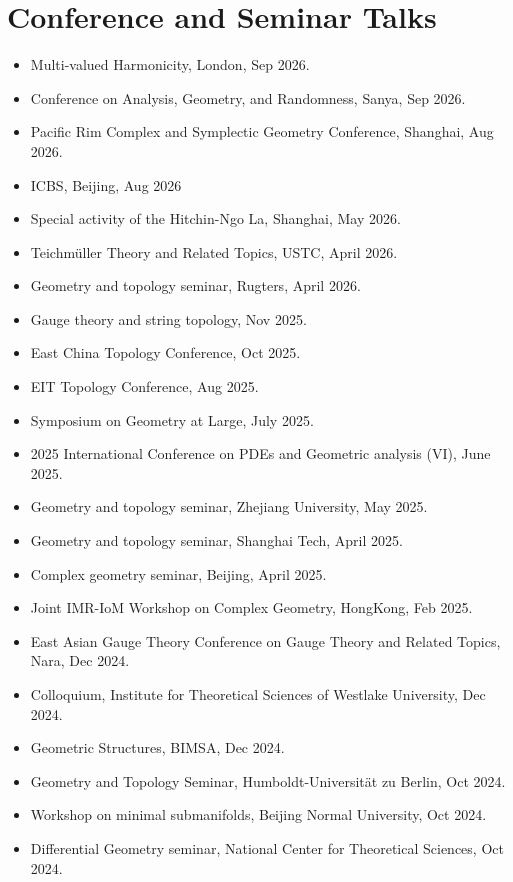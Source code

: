 \documentclass[a4paper,10pt]{article}
\begin{document}
\section*{Conference and Seminar Talks}
\begin{itemize}[leftmargin=1.5cm] 
\item Multi-valued Harmonicity, London, Sep 2026.
\item Conference on Analysis, Geometry, and Randomness, Sanya, Sep 2026.
\item Pacific Rim Complex and Symplectic Geometry Conference, Shanghai, Aug 2026.
\item ICBS, Beijing, Aug 2026
\item Special activity of the Hitchin-Ngo La, Shanghai, May 2026.
\item Teichm\"uller Theory and Related Topics, USTC, April 2026.
\item Geometry and topology seminar, Rugters, April 2026.
\item Gauge theory and string topology, Nov 2025.
\item East China Topology Conference, Oct 2025.
\item EIT Topology Conference, Aug 2025.
\item Symposium on Geometry at Large, July 2025.
   \item 2025 International Conference on PDEs and Geometric analysis (VI), June 2025.
   \item Geometry and topology seminar, Zhejiang University, May 2025.
   \item Geometry and topology seminar, Shanghai Tech, April 2025.
   \item Complex geometry seminar, Beijing, April 2025.
   \item  Joint IMR-IoM Workshop on Complex Geometry, HongKong, Feb 2025.
    \item East Asian Gauge Theory Conference on Gauge Theory and Related Topics, Nara, Dec 2024.
    \item Colloquium, Institute for Theoretical Sciences of Westlake University, Dec 2024.
    \item Geometric Structures, BIMSA, Dec 2024.
    \item Geometry and Topology Seminar, Humboldt-Universität zu Berlin, Oct 2024.
    \item Workshop on minimal submanifolds, Beijing Normal University, Oct 2024.
    \item Differential Geometry seminar, National Center for Theoretical Sciences, Oct 2024.

\end{itemize}
\end{document}
